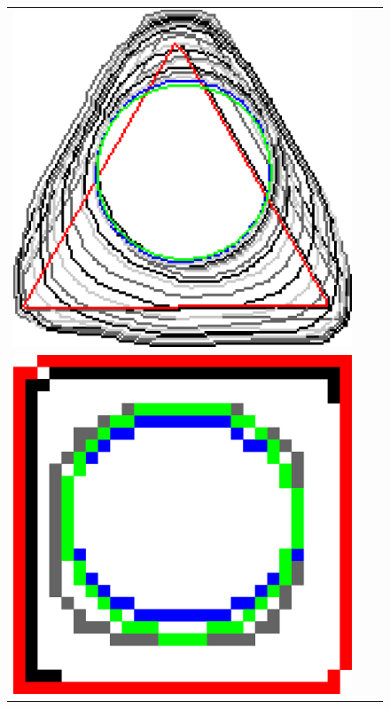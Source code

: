 \begin{figure}[hp!]
\begin{tabular}{ccc}
	\includegraphics[scale=0.185]{figures/chapter5/flow/triangle/radius_5/ii/elastica/len_pen_0.01000/jonctions_1/curve_segs_4/best/gs_0.25000/summary.pdf}\\[2em]
		
	\includegraphics[scale=0.17]{figures/chapter5/flow/square/radius_5/ii/elastica/len_pen_0.01000/jonctions_1/curve_segs_4/best/gs_1.00000/summary.pdf} &
	

\end{tabular}
\end{figure}
